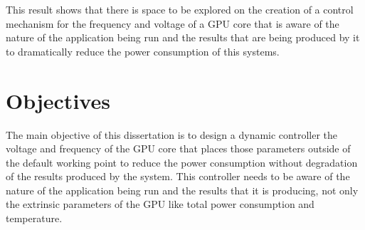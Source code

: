 This result shows that there is space to be explored on the creation of a control mechanism for the frequency and voltage of a GPU core that is aware of the nature of the application being run and the results that are being produced by it to dramatically reduce the power consumption of this systems.

\section{Objectives}
\label{section:objectives}

The main objective of this dissertation is to design a dynamic controller the voltage and frequency of the GPU core that places those parameters outside of the default working point to reduce the power consumption without degradation of the results produced by the system. This controller needs to be aware of the nature of the application being run and the results that it is producing, not only the extrinsic parameters of the GPU like total power consumption and temperature.

